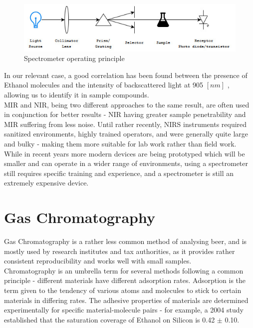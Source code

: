 \documentclass[twoside]{ctuthesis}
\theoremstyle{plain}
\theoremstyle{definition}
\theoremstyle{note}
\begin{document}
\begin{figure}[H]
	\centering
	\includegraphics[width = \textwidth]{spectrometer_scheme}
	\caption{Spectrometer operating principle}
\end{figure}

In our relevant case, a good correlation has been found between the presence of Ethanol molecules and the intensity of backscattered light at 905 $[nm]$  \cite{NIR_Spectroscopy_Ethanol}, allowing us to identify it in sample compounds.\\
MIR and NIR, being two different approaches to the same result, are often used in conjunction for better results - NIR having greater sample penetrability and MIR suffering from less noise.
Until rather recently, NIRS instruments required sanitized environments, highly trained operators, and were generally quite large and bulky - making them more suitable for lab work rather than field work\cite{NIR_For_Spices}.\\ While in recent years more modern devices are being prototyped which will be smaller and can operate in a wider range of environments, using a spectrometer still requires specific training and experience, and a spectrometer is still an extremely expensive device.

\section{Gas Chromatography}
Gas Chromatography is a rather less common method of analysing beer, and is mostly used by research institutes and tax authorities, as it provides rather consistent reproducibility and works well with small samples.\\
Chromatography is an umbrella term for several methods following a common principle - different materials have different adsorption rates. Adsorption is the term given to the tendency of various atoms and molecules to stick to certain materials in differing rates. The adhesive properties of materials are determined experimentally for specific material-molecule pairs - for example, a 2004 study established that the saturation coverage of Ethanol on Silicon is 0.42 $\pm$ 0.10.\cite{Ehtnaol_adsorption,Gas_Chromatography_beer}\\
\end{document}
